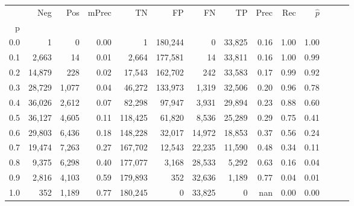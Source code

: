 \begin{tabular}{rrrrrrrrrrrrrr}
\toprule
{} &     Neg &    Pos & mPrec &       TN &       FP &      FN &      TP &  Prec &   Rec & $\hat{p}$ \\
p   &         &        &       &          &          &         &         &       &       &           \\
\midrule
0.0 &       1 &      0 &  0.00 &        1 &  180,244 &       0 &  33,825 &  0.16 &  1.00 &      1.00 \\
0.1 &   2,663 &     14 &  0.01 &    2,664 &  177,581 &      14 &  33,811 &  0.16 &  1.00 &      0.99 \\
0.2 &  14,879 &    228 &  0.02 &   17,543 &  162,702 &     242 &  33,583 &  0.17 &  0.99 &      0.92 \\
0.3 &  28,729 &  1,077 &  0.04 &   46,272 &  133,973 &   1,319 &  32,506 &  0.20 &  0.96 &      0.78 \\
0.4 &  36,026 &  2,612 &  0.07 &   82,298 &   97,947 &   3,931 &  29,894 &  0.23 &  0.88 &      0.60 \\
0.5 &  36,127 &  4,605 &  0.11 &  118,425 &   61,820 &   8,536 &  25,289 &  0.29 &  0.75 &      0.41 \\
0.6 &  29,803 &  6,436 &  0.18 &  148,228 &   32,017 &  14,972 &  18,853 &  0.37 &  0.56 &      0.24 \\
0.7 &  19,474 &  7,263 &  0.27 &  167,702 &   12,543 &  22,235 &  11,590 &  0.48 &  0.34 &      0.11 \\
0.8 &   9,375 &  6,298 &  0.40 &  177,077 &    3,168 &  28,533 &   5,292 &  0.63 &  0.16 &      0.04 \\
0.9 &   2,816 &  4,103 &  0.59 &  179,893 &      352 &  32,636 &   1,189 &  0.77 &  0.04 &      0.01 \\
1.0 &     352 &  1,189 &  0.77 &  180,245 &        0 &  33,825 &       0 &   nan &  0.00 &      0.00 \\
\bottomrule
\end{tabular}
